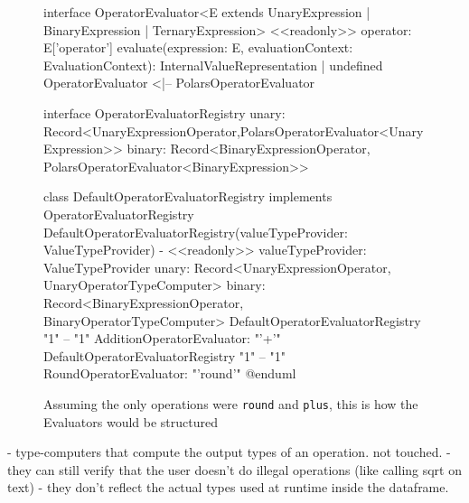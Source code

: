 \begin{figure}
\begin{plantuml}
		interface OperatorEvaluator<E extends UnaryExpression | BinaryExpression | TernaryExpression> {
				<<readonly>> operator: E['operator']
				evaluate(expression: E, evaluationContext: EvaluationContext): InternalValueRepresentation | undefined
			}
		OperatorEvaluator <|-- PolarsOperatorEvaluator

		interface OperatorEvaluatorRegistry {
				unary: Record<UnaryExpressionOperator,PolarsOperatorEvaluator<UnaryExpression>>
				binary: Record<BinaryExpressionOperator, PolarsOperatorEvaluator<BinaryExpression>>
			}

		class DefaultOperatorEvaluatorRegistry implements OperatorEvaluatorRegistry {
				DefaultOperatorEvaluatorRegistry(valueTypeProvider: ValueTypeProvider)
				- <<readonly>> valueTypeProvider: ValueTypeProvider
				unary: Record<UnaryExpressionOperator, UnaryOperatorTypeComputer>
				binary: Record<BinaryExpressionOperator, BinaryOperatorTypeComputer>
			}
		DefaultOperatorEvaluatorRegistry "1" -- "1" AdditionOperatorEvaluator: "'+'"
		DefaultOperatorEvaluatorRegistry "1" -- "1" RoundOperatorEvaluator: "'round'"
		@enduml
	\end{plantuml}
	\caption{Assuming the only operations were \Verb|round| and \Verb|plus|, this is how the Evaluators would be structured}
	\label{fig:evaluators_class_diagram}
\end{figure}



- type-computers that compute the output types of an operation. not touched.
- they can still verify that the user doesn't do illegal operations (like calling sqrt on text)
- they don't reflect the actual types used at runtime inside the dataframe.
